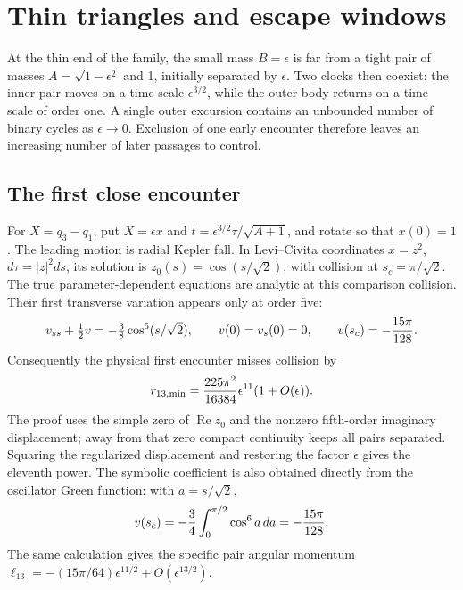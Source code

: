 \section{Thin triangles and escape windows}\label{sec:skinny}

At the thin end of the family, the small mass $B=\epsilon$ is far from a
tight pair of masses $A=\sqrt{1-\epsilon^2}$ and 1, initially separated by
$\epsilon$. Two clocks then coexist: the inner pair moves on a time scale
$\epsilon^{3/2}$, while the outer body returns on a time scale of order
one. A single outer excursion contains an unbounded number of binary
cycles as $\epsilon\to0$. Exclusion of one early encounter therefore
leaves an increasing number of later passages to control.

\subsection{The first close encounter}

For $X=q_3-q_1$, put $X=\epsilon x$ and
$t=\epsilon^{3/2}\tau/\sqrt{A+1}$, and rotate so that $x(0)=1$.
The leading motion is radial Kepler fall. In Levi--Civita coordinates
$x=z^2$, $d\tau=|z|^2ds$, its solution is
$z_0(s)=\cos(s/\sqrt2)$, with collision at $s_c=\pi/\sqrt2$.
The true parameter-dependent equations are analytic at this comparison
collision. Their first transverse variation appears only at order five:
\[
 v_{ss}+\tfrac12v=-\tfrac38\cos^5(s/\sqrt2),\qquad
 v(0)=v_s(0)=0,\qquad v(s_c)=-{15\pi\over128}.
\]
Consequently the physical first encounter misses collision by
\begin{equation}\label{eq:skinny-miss}
 r_{13,\min}={225\pi^2\over16384}\epsilon^{11}(1+O(\epsilon)).
\end{equation}
The proof uses the simple zero of $\operatorname{Re}z_0$ and the nonzero
fifth-order imaginary displacement; away from that zero compact continuity
keeps all pairs separated. Squaring the regularized displacement and
restoring the factor $\epsilon$ gives the eleventh power. The symbolic
coefficient is also obtained directly from the oscillator Green function:
with $a=s/\sqrt2$,
\[
 v(s_c)=-{3\over4}\int_0^{\pi/2}\cos^6 a\,da
 =-{15\pi\over128}.
\]
The same calculation gives the specific pair angular momentum
$\ell_{13}=-(15\pi/64)\epsilon^{11/2}+O(\epsilon^{13/2})$.

